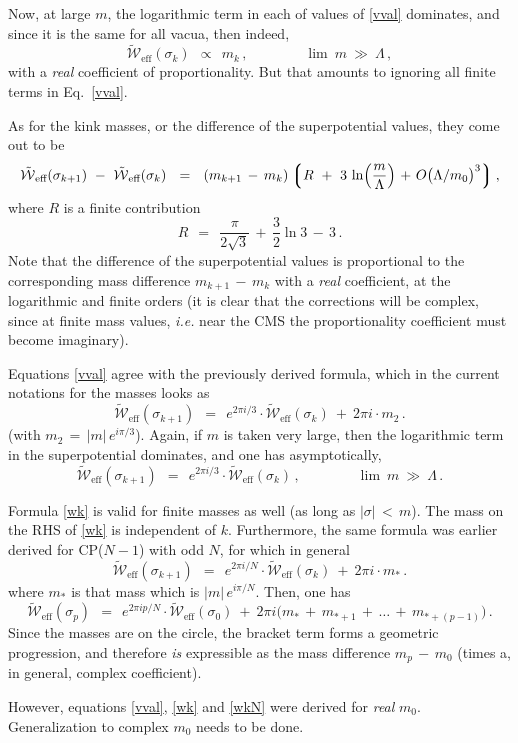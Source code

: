 \documentclass[12pt]{article}
\def\beq{\begin{equation}}
\def\eeq{\end{equation}}
\newcommand{\mc}[1]{\mathcal{#1}}
\newcommand{\lgr}{\left\lgroup}
\newcommand{\rgr}{\right\rgroup}
\newcommand{\ww}{\tilde{\mc{W}}{}_\text{eff}}
\begin{document}
	Now, at large $m$, the logarithmic term in each of values of \eqref{vval} dominates, and since
	it is the same for all vacua, then indeed,
\beq
	\ww(\sigma_k) ~~\propto~~ m_k\,,  \qquad\qquad \lim~m~\gg~\Lambda\,,
\eeq
	with a {\it real} coefficient of proportionality. 
	But that amounts to ignoring all finite terms in Eq.~\eqref{vval}.

	As for the kink masses, or the difference of the superpotential values, they come out to be
\beq
	\ww(\sigma_{k+1}) ~-~ \ww(\sigma_k)  ~~=~~ 
	(m_{k+1} \,-\, m_k)
	\lgr R ~+~ 3\, \ln \Bigl(\frac{m}{\Lambda}\Bigl) ~+~ O \bigl( \Lambda/m_0 \bigr)^3 \rgr,
\eeq
	where $ R $ is a finite contribution
\beq
	R ~~=~~ \frac{\pi}{2\sqrt{3}} \,+\, \frac{3}{2} \ln 3 \,-\, 3 \,.
\eeq
	Note that the difference of the superpotential values is proportional to the corresponding
	mass difference $ m_{k+1} \,-\, m_k $ with a {\it real} coefficient,
	at the logarithmic and finite orders
	(it is clear that the corrections will be complex, since at finite mass values,
	{\it i.e.} near the CMS the proportionality coefficient must become imaginary). 

	Equations \eqref{vval} agree with the previously derived formula, which in the current
	notations for the masses looks as 
\beq
\label{wk}
	\ww (\sigma_{k+1}) ~~=~~ e^{2\pi i /3 } \cdot \ww (\sigma_k) ~+~ 2\pi i \cdot m_2\,.
\eeq
	(with $ m_2 \,=\, |m|\, e^{i \pi /3} $).
	Again, if $ m $ is taken very large, then the logarithmic term in the superpotential
	dominates, and one has asymptotically,
\beq
	\ww (\sigma_{k+1}) ~~=~~ e^{2\pi i /3 } \cdot \ww (\sigma_k) \,, \qquad\qquad
				\lim~m~\gg~\Lambda\,.
\eeq

	Formula \eqref{wk} is valid for finite masses as well (as long as 
	$ |\sigma| \,<\, m $).
	The mass on the RHS of \eqref{wk} is independent of $ k $.
	Furthermore, the same formula was earlier derived for CP($N-1$) with odd $N$, for which 
	in general 
\beq
\label{wkN}
	\ww (\sigma_{k+1}) ~~=~~ e^{2\pi i /N } \cdot \ww (\sigma_k) ~+~ 2\pi i \cdot m_*\,.
\eeq
	where $ m_* $ is that mass which is $ |m|\,e^{i\pi/N} $.
	Then, one has
\beq
	\ww (\sigma_{p}) ~~=~~ e^{2\pi i p/N } \cdot \ww (\sigma_0)
		~+~ 2\pi i \bigl( m_* \,+\, m_{*+1} \,+\, \dots \,+\, m_{*+(p-1)} \bigr)\,.
\eeq
	Since the masses are on the circle, the bracket term forms a geometric progression,
	and therefore {\it is} expressible as the mass difference $ m_p \,-\, m_0 $ 
	(times a, in general, complex coefficient). 

	However, equations \eqref{vval}, \eqref{wk} and \eqref{wkN} were derived for
	{\it real} $ m_0 $.
	Generalization to complex $ m_0 $ needs to be done.
\end{document}
